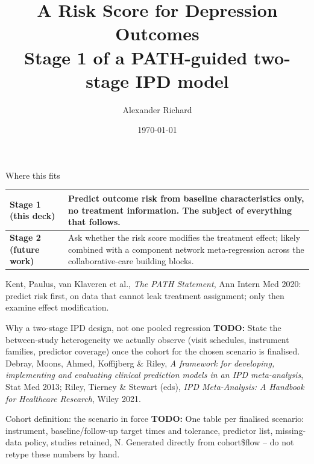 \documentclass[11pt, t, handout]{beamer}
\title{A Risk Score for Depression Outcomes \\ \large Stage 1 of a PATH-guided two-stage IPD model}
\author{Alexander Richard}
\institute{DSSGx Munich, Collaborative Care IPD}
\date{\today}
\newcommand{\ans}[1]{\textcolor{structure.fg}{#1}}
\newcommand{\todo}[1]{\textcolor{red!70!black}{\textbf{TODO:} #1}}
\begin{document}
\begin{frame}\titlepage\end{frame}

\begin{frame}{Where this fits}
  \pause
  \begin{center}\footnotesize
  \begin{tabular}{p{3.6cm}p{6.5cm}}
    \toprule
    \textbf{Stage 1 (this deck)} & Predict outcome risk from baseline
    characteristics only, no treatment information. \ans{The subject of
    everything that follows.} \\
    \midrule
    \textbf{Stage 2 (future work)} & Ask whether the risk score modifies
    the treatment effect; likely combined with a component network
    meta-regression across the collaborative-care building blocks. \\
    \bottomrule
  \end{tabular}
  \end{center}
  \vspace{10pt}
  \pause
  {\footnotesize Kent, Paulus, van Klaveren et al., \emph{The PATH
   Statement}, Ann Intern Med 2020: predict risk first, on data that
   cannot leak treatment assignment; only then examine effect
   modification.}
\end{frame}

\begin{frame}{Why a two-stage IPD design, not one pooled regression}
  \pause
  \todo{State the between-study heterogeneity we actually observe (visit
  schedules, instrument families, predictor coverage) once the cohort for
  the chosen scenario is finalised.}
  \vspace{8pt}
  \pause
  {\footnotesize Debray, Moons, Ahmed, Koffijberg \& Riley, \emph{A
   framework for developing, implementing and evaluating clinical
   prediction models in an IPD meta-analysis}, Stat Med 2013; Riley,
   Tierney \& Stewart (eds), \emph{IPD Meta-Analysis: A Handbook for
   Healthcare Research}, Wiley 2021.}
\end{frame}

\begin{frame}{Cohort definition: the scenario in force}
  \pause
  \todo{One table per finalised scenario: instrument, baseline/follow-up
  target times and tolerance, predictor list, missing-data policy,
  studies retained, N. Generated directly from cohort\$flow -- do not
  retype these numbers by hand.}
\end{frame}
\end{document}
